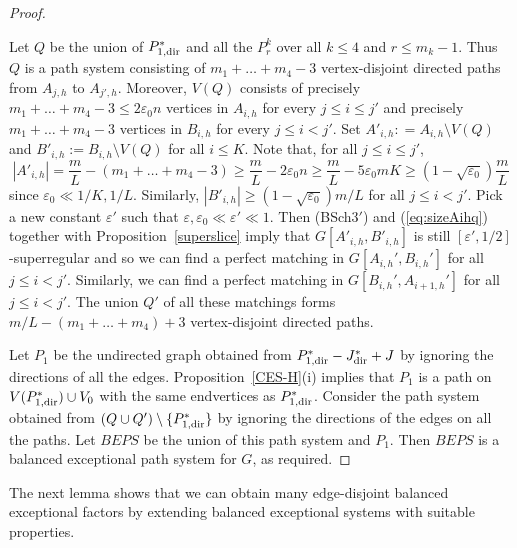 \documentclass{memo-l}
\def\eps{\varepsilon}
\def\epszero{\eps_0}
\numberwithin{section}{chapter}
\numberwithin{equation}{section}
\numberwithin{firstthm}{section}
\numberwithin{figure}{section}
\begin{document}
{\begin{proof}
\begin{itemize}
\end{itemize}
Let $Q$ be the union of $P^*_{1,{\rm dir}}$ and all the $P_r^{k}$ over all $k \le 4$ and $r \le m_k-1$.
Thus $Q$ is a path system consisting of $m_1+\dots+m_4 - 3 $ vertex-disjoint directed paths from $A_{j,h}$ to $A_{j',h}$.
Moreover, $V(Q)$ consists of precisely $m_1+\dots+m_4 - 3 \le  2\epszero n$ vertices in $A_{i,h}$
for every $j\le i\le j'$ and precisely $m_1+\dots+m_4-3$ vertices in $B_{i,h}$ for every $j\le i<j'$. 
Set $A'_{i,h}: = A_{i,h} \setminus V(Q)$ and $B'_{i,h}:= B_{i,h} \setminus V(Q)$ for all $i \le K$.
Note that, for all $j \leq i \leq j'$,
\begin{equation}\label{eq:sizeAihq}
|  A'_{i,h}|= \frac{m}{L}-(m_1+\dots+m_4-3)\ge \frac{m}{L}-2\eps_0 n\ge \frac{m}{L}-5\eps_0 mK\ge (1-\sqrt{\eps_0})\frac{m}{L}
\end{equation}
since $\eps_0\ll 1/K,1/L$. Similarly, $|  B'_{i,h}| \geq (1-\sqrt{\eps_0}){m}/{L}$ for all
 $j \leq i < j'$.
Pick a new constant $\eps'$ such that $\eps,\eps_0 \ll \eps'\ll 1$.
Then (BSch$3'$) and (\ref{eq:sizeAihq}) together with Proposition~\ref{superslice} imply that 
$G[A'_{i,h}, B'_{i,h}]$ is still $[\eps',1/2]$-superregular 
and so we can find a perfect matching in $G[A_{i,h}',B_{i,h}']$
for all $j \le i < j'$. Similarly, we can find a perfect matching in $G[B_{i,h}',A_{i+1,h}']$ for all $j \le i < j'$.
The union $Q'$ of all these matchings forms $m/L-(m_1+\dots+m_4) +3$ vertex-disjoint directed paths.

Let $P_1$ be the undirected graph obtained from $P^*_{1,{\rm dir}}-J^*_{\rm dir}+J$ by ignoring the
directions of all the edges. Proposition~\ref{CES-H}(i) implies that $P_1$
is a path on $V(P^*_{1,{\rm dir}})\cup V_0$ with the same endvertices as $P^*_{1,{\rm dir}}$.
Consider the path system obtained from $(Q\cup Q') \setminus \{P^*_{1,{\rm dir}}\}$ by ignoring the directions of the edges on all
the paths. Let $BEPS$ be the union of this path system and $P_1$. Then $BEPS$ is a balanced exceptional path system for $G$, as required.
\end{proof}

The next lemma shows that we can obtain many edge-disjoint balanced exceptional factors by extending balanced exceptional systems with suitable properties.

}
\end{document}
